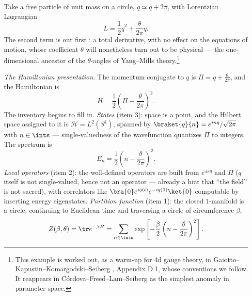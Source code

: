 \begin{eexample}[The inventory in $d=1$: a particle on a circle]
\label{ex:particle-circle}
Take a free particle of unit mass on a circle, $q \simeq q + 2\pi$, with
Lorentzian Lagrangian
\begin{equation}
L = \frac{1}{2}\dot q^2 + \frac{\theta}{2\pi} \dot q .
\label{eq:circle-lagrangian}
\end{equation}
The second term is our first : a total derivative, with
no effect on the equations of motion, whose coefficient $\theta$ will
nonetheless turn out to be physical --- the one-dimensional ancestor of the
$\theta$-angles of Yang--Mills theory.\footnote{This example is worked out, as a
warm-up for 4d gauge theory, in Gaiotto--Kapustin--Komargodski--Seiberg
, Appendix D.1, whose conventions we follow. It reappears in
C\'ordova--Freed--Lam--Seiberg  as the simplest anomaly in
parameter space.}

\emph{The Hamiltonian presentation.} The momentum conjugate to $q$ is $\Pi =
\dot q + \frac{\theta}{2\pi}$, and the Hamiltonian is
\begin{equation}
H = \frac{1}{2}\left(\Pi - \frac{\theta}{2\pi}\right)^2 .
\end{equation}
The inventory begins to fill in. \emph{States} (item 3): space is a point, and
the Hilbert space assigned to it is $\mathcal{H} = L^2(S^1)$, spanned by
$\braket{q}{n} = e^{inq}/\sqrt{2\pi}$ with $n \in \ints$ --- single-valuedness
of the wavefunction quantizes $\Pi$ to integers. The spectrum is
\begin{equation}
E_n = \frac{1}{2}\left(n - \frac{\theta}{2\pi}\right)^2 .
\label{eq:circle-spectrum}
\end{equation}
\emph{Local operators} (item 2): the well-defined operators are built from
$e^{\pm iq}$ and $\Pi$ ($q$ itself is not single-valued, hence not an operator
--- already a hint that ``the field'' is not sacred), with correlators like
$\bra{0} e^{iq(t)} e^{-iq(0)} \ket{0}$ computable by inserting energy
eigenstates. \emph{Partition function} (item 1): the closed $1$-manifold is a
circle; continuing to Euclidean time and traversing a circle of circumference
$\beta$,
\begin{equation}
Z(\beta, \theta) = \tr e^{-\beta H}
  = \sum_{n \in \ints}
    \exp\left[-\frac{\beta}{2}\left(n - \frac{\theta}{2\pi}\right)^2\right].
\label{eq:Z-hamiltonian}
\end{equation}


\end{eexample}
